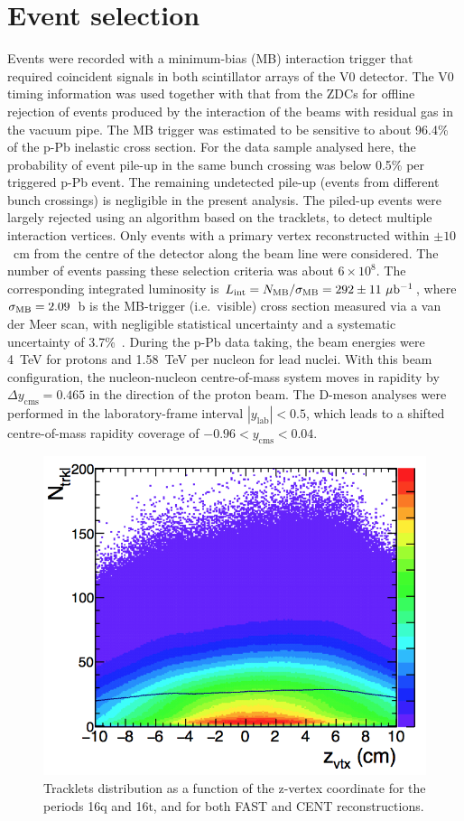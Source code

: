 \section{Event selection}
\label{sec:EvSelpPb}
Events were recorded with a minimum-bias (MB) interaction trigger 
that required coincident signals in both scintillator arrays of the V0 detector.
The V0 timing information was used together with that from the ZDCs for offline rejection 
of events produced by the interaction of the beams with residual gas in the vacuum pipe.
The MB trigger was estimated to be sensitive to about 96.4\% of the p-Pb inelastic cross section.
For the data sample analysed here, the probability of event pile-up in the 
same bunch crossing was below 0.5\% per triggered p-Pb event.
The remaining undetected pile-up (events from different bunch crossings) 
is negligible in the present analysis.
The piled-up events were largely rejected using an algorithm based on the tracklets,
to detect multiple interaction vertices.
Only events with a primary vertex reconstructed within $\pm 10$~cm from the 
centre of the detector along the beam line were considered. 
The number of events passing these selection criteria was about $6\times 10^8$.
The corresponding integrated luminosity is 
$L_{\rm int} =N_{\rm MB}/\sigma_{\rm MB}=292 \pm 11~\mu{\rm b}^{-1}$,
where $\sigma_{\rm MB}=2.09$~b is the MB-trigger (i.e.\ visible) cross section  
measured via a van der Meer scan, with negligible statistical uncertainty 
and a systematic uncertainty of 3.7\%~\cite{Abelev:2014epa}.
During the p-Pb data taking, the beam energies were 4~TeV for 
protons and 1.58~TeV per nucleon for lead nuclei. 
With this beam configuration, the nucleon-nucleon centre-of-mass system 
moves in rapidity by $\Delta y_{\mathrm{cms}}=0.465$ in the direction 
of the proton beam. The D-meson analyses were performed in 
the laboratory-frame interval $|y_{\mathrm{lab}}|<0.5$, 
which leads to a shifted centre-of-mass rapidity coverage 
of $-0.96 < y_{\mathrm{cms}} < 0.04$.\\

\begin{figure}[h]
\centering
 \includegraphics[width=.6\textwidth]{FigCap6/NtrklVsVxtZ_Data.png}
 \caption{Tracklets distribution as a function of the z-vertex coordinate for the periods 16q and 16t, and for both FAST and CENT reconstructions.}
 \label{fig:NtrklVsZ2D}
\end{figure}


